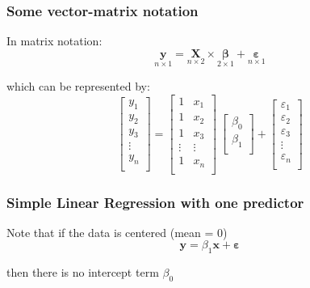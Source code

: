 \documentclass[12pt]{beamer}\usepackage[]{graphicx}\usepackage[]{color}
\begin{document}
\begin{frame}
\frametitle{Some vector-matrix notation}

In matrix notation:
$$
\underset{n\times 1}{\mathbf{y}} =  \underset{n \times 2}{\mathbf{X}} \times 
\underset{2\times 1}{\boldsymbol{\beta}} + \underset{n\times 1}{\boldsymbol{\varepsilon}}
$$

which can be represented by:
$$
\begin{bmatrix} 
y_1 \\
y_2 \\
y_3 \\
\vdots \\
y_n \\
\end{bmatrix}
=
\begin{bmatrix} 
1 & x_{1} \\
1 & x_{2} \\
1 & x_{3} \\
\vdots & \vdots \\
1 & x_{n} \\
\end{bmatrix}
\
\begin{bmatrix} 
\beta_0 \\ 
\beta_1 \\
\end{bmatrix}
+
\begin{bmatrix} 
\varepsilon_1 \\
\varepsilon_2 \\
\varepsilon_3 \\
\vdots \\
\varepsilon_n \\
\end{bmatrix}
$$

\end{frame}


\begin{frame}
\frametitle{Simple Linear Regression with one predictor}

Note that if the data is centered (mean = 0)
{\large
$$
\mathbf{y} = \beta_1 \mathbf{x} + \boldsymbol{\varepsilon}
$$
}

then there is no intercept term $\beta_0$

\end{frame}

\end{document}
